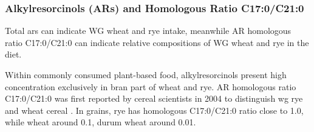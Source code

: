 \subsubsection{Alkylresorcinols (ARs) and Homologous Ratio C17:0/C21:0}
Total \acrfull{ars} can indicate WG wheat and rye intake, meanwhile AR homologous ratio C17:0/C21:0 can indicate relative compositions of WG wheat and rye in the diet.

Within commonly consumed plant-based food, alkylresorcinols present high concentration exclusively in bran part of wheat and rye. AR homologous ratio C17:0/C21:0 was first reported by cereal scientists in 2004 to distinguish \acrshort{wg} rye and wheat cereal \cite{Chen2004}. In grains, rye has homologous C17:0/C21:0 ratio close to 1.0, while wheat around 0.1, durum wheat around 0.01.
